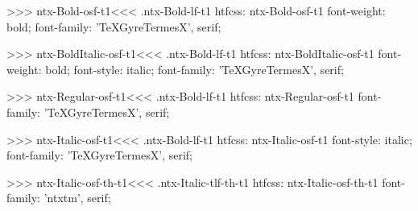 >>>
\<ntx-Bold-osf-t1\><<<
.ntx-Bold-lf-t1
htfcss:  ntx-Bold-osf-t1  font-weight: bold; font-family: 'TeXGyreTermesX', serif;

>>>
\<ntx-BoldItalic-osf-t1\><<<
.ntx-Bold-lf-t1
htfcss:  ntx-BoldItalic-osf-t1  font-weight: bold; font-style: italic; font-family: 'TeXGyreTermesX', serif;

>>>
\<ntx-Regular-osf-t1\><<<
.ntx-Bold-lf-t1
htfcss:  ntx-Regular-osf-t1  font-family: 'TeXGyreTermesX', serif;

>>>
\<ntx-Italic-osf-t1\><<<
.ntx-Bold-lf-t1
htfcss:  ntx-Italic-osf-t1  font-style: italic; font-family: 'TeXGyreTermesX', serif;

>>>
\<ntx-Italic-osf-th-t1\><<<
.ntx-Italic-tlf-th-t1
htfcss:  ntx-Italic-osf-th-t1  font-family: 'ntxtm', serif;

